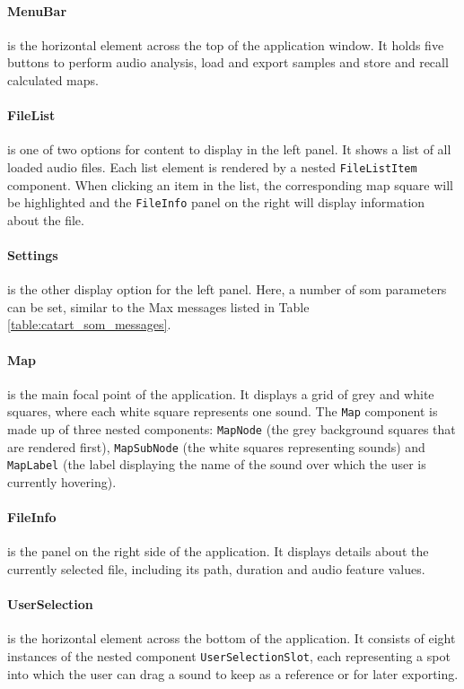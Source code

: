 \paragraph*{MenuBar}
\label{para:menu_bar}
is the horizontal element across the top of the application window. It holds
five buttons to perform audio analysis, load and export samples and store and
recall calculated maps.

\paragraph*{FileList}
\label{para:file_list}
is one of two options for content to display in the left panel. It shows a list
of all loaded audio files. Each list element is rendered by a nested
\texttt{FileListItem} component. When clicking an item in the list, the
corresponding map square will be highlighted and the \texttt{FileInfo}
panel on the right will display information about the file.

\paragraph*{Settings}
\label{para:settings}
is the other display option for the left panel. Here, a number of \gls{som}
parameters can be set, similar to the Max messages listed in Table
\ref{table:catart_som_messages}.

\paragraph*{Map}
\label{para:map}
is the main focal point of the application. It displays a grid of grey and white
squares, where each white square represents one sound. The \texttt{Map}
component is made up of three nested components: \texttt{MapNode} (the
grey background squares that are rendered first), \texttt{MapSubNode}
(the white squares representing sounds) and \texttt{MapLabel} (the
label displaying the name of the sound over which the user is currently
hovering).

\paragraph*{FileInfo}
\label{para:file_info}
is the panel on the right side of the application. It displays details about the
currently selected file, including its path, duration and audio feature values.

\paragraph*{UserSelection}
\label{para:user_selection}
is the horizontal element across the bottom of the application. It consists of
eight instances of the nested component \texttt{UserSelectionSlot},
each representing a spot into which the user can drag a sound to keep as a
reference or for later exporting.

